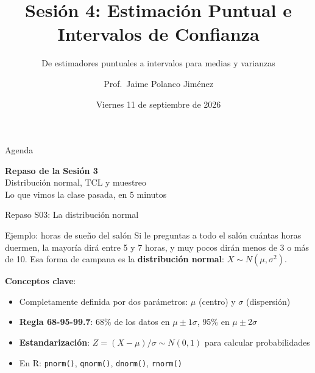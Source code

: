 \documentclass[aspectratio=169, 11pt]{beamer}
\title{Sesión 4: Estimación Puntual e Intervalos de Confianza}
\subtitle{De estimadores puntuales a intervalos para medias y varianzas}
\author{Prof.\ Jaime Polanco Jim\'enez}
\date{Viernes 11 de septiembre de 2026}
\begin{document}
\begin{frame}
\titlepage
\end{frame}

\begin{frame}{Agenda}
\tableofcontents
\end{frame}

\begin{frame}{}
\vfill
\centering
{\Large\textbf{Repaso de la Sesi\'on 3}}\\[1em]
{\normalsize Distribuci\'on normal, TCL y muestreo}\\[0.5em]
{\small Lo que vimos la clase pasada, en 5 minutos}
\vfill
\end{frame}

\begin{frame}{Repaso S03: La distribuci\'on normal}
\small
\begin{exampleblock}{Ejemplo: horas de sue\~no del sal\'on}
Si le preguntas a todo el sal\'on cu\'antas horas duermen, la mayor\'ia dir\'a entre 5 y 7 horas, y muy pocos dir\'an menos de 3 o m\'as de 10. Esa forma de campana es la \textbf{distribuci\'on normal}: $X \sim N(\mu, \sigma^2)$.
\end{exampleblock}

\textbf{Conceptos clave}:
\begin{itemize}\setlength{\itemsep}{1pt}
  \item Completamente definida por dos par\'ametros: $\mu$ (centro) y $\sigma$ (dispersi\'on)
  \item \textbf{Regla 68-95-99.7}: 68\% de los datos en $\mu \pm 1\sigma$, 95\% en $\mu \pm 2\sigma$
  \item \textbf{Estandarizaci\'on}: $Z = (X - \mu)/\sigma \sim N(0,1)$ para calcular probabilidades
  \item En R: \texttt{pnorm()}, \texttt{qnorm()}, \texttt{dnorm()}, \texttt{rnorm()}
\end{itemize}
\end{frame}
\end{document}
